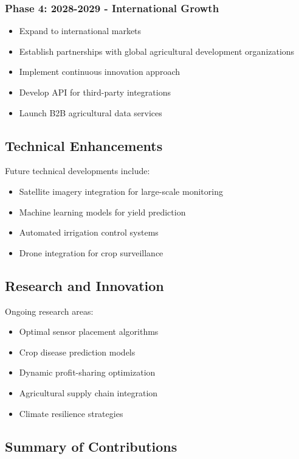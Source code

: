 \documentclass[9pt,twocolumn,twoside]{article}
\begin{document}
\subsubsection{Phase 4: 2028-2029 - International Growth}

\begin{itemize}
  \item Expand to international markets
  \item Establish partnerships with global agricultural development organizations
  \item Implement continuous innovation approach
  \item Develop API for third-party integrations
  \item Launch B2B agricultural data services
\end{itemize}

\subsection{Technical Enhancements}

Future technical developments include:

\begin{itemize}
  \item Satellite imagery integration for large-scale monitoring
  \item Machine learning models for yield prediction
  \item Automated irrigation control systems
  \item Drone integration for crop surveillance
\end{itemize}
\subsection{Research and Innovation}

Ongoing research areas:

\begin{itemize}
  \item Optimal sensor placement algorithms
  \item Crop disease prediction models
  \item Dynamic profit-sharing optimization
  \item Agricultural supply chain integration
  \item Climate resilience strategies
\end{itemize}

\subsection{Summary of Contributions}
\end{document}
